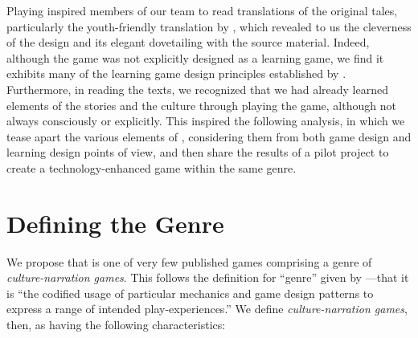 \documentclass[a4paper]{article}
\begin{document}
Playing \totan{}  inspired members of our team to read translations
of the original tales,
particularly  the youth-friendly translation by \citep{Neil1994},
which revealed to us the cleverness of the design
and its elegant dovetailing with the source material.
Indeed, although the game was not explicitly designed as a learning game,
we find it exhibits many of the learning game design principles
established by \citet{Klopfer2009}.
Furthermore, in reading the texts, we recognized that we had already
learned elements of the stories and the culture through playing the game,
although not always consciously or explicitly.
This inspired the following analysis, in which we tease apart the
various elements of \totan{}, considering them from both game design
and learning design points of view, and then share the results of a pilot
project to create a technology-enhanced game within the same genre.

\section{Defining the Genre}

We propose that \totan{} is one of very few published games comprising
a genre of \textit{culture-narration games}.  This follows the
definition for ``genre'' given by \citet{Arsenault2009}---that it is
``the codified usage of particular mechanics and game design patterns
to express a range of intended play-experiences.''  We define
\textit{culture-narration games}, then, as having the following
characteristics:
\end{document}
